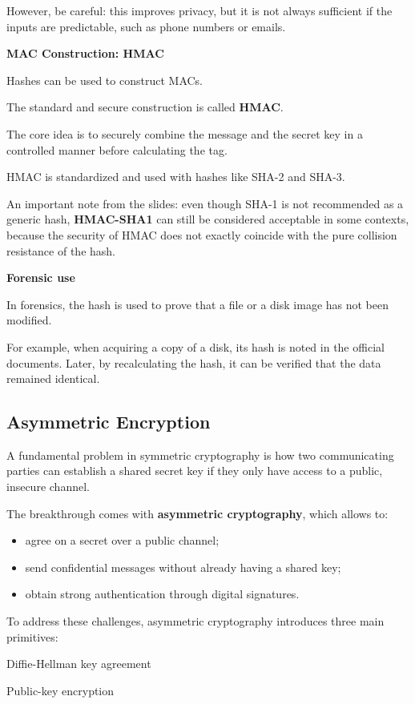 \documentclass{article}
\begin{document}
However, be careful: this improves privacy, but it is not always sufficient if the inputs are predictable, such as phone numbers or emails.

\textbf{MAC Construction: HMAC}

Hashes can be used to construct MACs.

The standard and secure construction is called \textbf{HMAC}.

The core idea is to securely combine the message and the secret key in a controlled manner before calculating the tag.

HMAC is standardized and used with hashes like SHA-2 and SHA-3.

An important note from the slides: even though SHA-1 is not recommended as a generic hash, \textbf{HMAC-SHA1} can still be considered acceptable in some contexts, because the security of HMAC does not exactly coincide with the pure collision resistance of the hash.

\textbf{Forensic use}

In forensics, the hash is used to prove that a file or a disk image has not been modified.

For example, when acquiring a copy of a disk, its hash is noted in the official documents. Later, by recalculating the hash, it can be verified that the data remained identical.

\subsection*{Asymmetric Encryption}

A fundamental problem in symmetric cryptography is how two communicating parties can establish a shared secret key if they only have access to a public, insecure channel.

The breakthrough comes with \textbf{asymmetric cryptography}, which allows to:
\begin{itemize}
\item agree on a secret over a public channel;
\item send confidential messages without already having a shared key;
\item obtain strong authentication through digital signatures.
\end{itemize}

To address these challenges, asymmetric cryptography introduces three main primitives:

Diffie-Hellman key agreement

Public-key encryption
\end{document}
